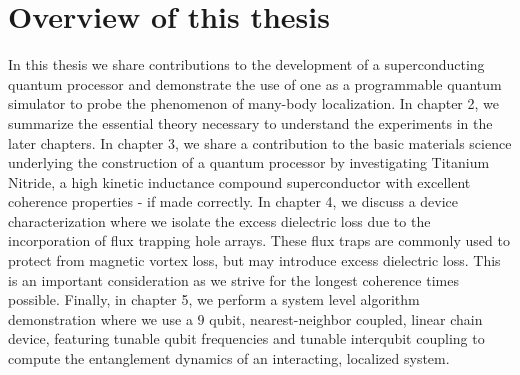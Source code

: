 \section{Overview of this thesis}
In this thesis we share contributions to the development of a superconducting quantum processor
and demonstrate the use of one as a programmable quantum simulator to probe the phenomenon of many-body localization.
In chapter 2, we summarize the essential theory necessary to understand the experiments in the later chapters.
In chapter 3, we share a contribution to the basic materials science underlying the construction of a quantum processor by investigating Titanium Nitride,
a high kinetic inductance compound superconductor with excellent coherence properties - if made correctly.
In chapter 4, we discuss a device characterization where we isolate the excess dielectric loss due to the incorporation of flux trapping hole arrays.
These flux traps are commonly used to protect from magnetic vortex loss, but may introduce excess dielectric loss.
This is an important consideration as we strive for the longest coherence times possible.
Finally, in chapter 5, we perform a system level algorithm demonstration where we use a $9$ qubit, nearest-neighbor coupled,
linear chain device, featuring tunable qubit frequencies and tunable interqubit coupling to compute the entanglement dynamics of an interacting, localized system.
